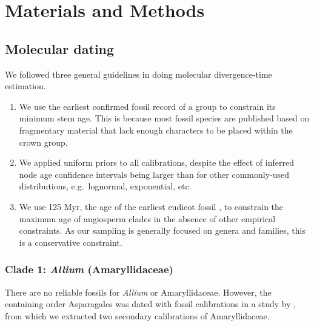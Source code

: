 \documentclass[10pt]{article}
\begin{document}
\raggedright
\parindent 0.5in



\clearpage
\newpage

\section*{Materials and Methods}

\subsection*{Molecular dating}

We followed three general guidelines in doing molecular
divergence-time estimation.

\begin{enumerate}

\item We use the earliest confirmed fossil record of a group to
  constrain its minimum stem age. This is because most fossil species
  are published based on fragmentary material that lack enough
  characters to be placed within the crown group.

\item We applied uniform priors to all calibrations, despite the
  effect of inferred node age confidence intervals being larger than
  for other commonly-used distributions, e.g.\ lognormal, exponential,
  etc.%

\item We use 125 Myr, the age of the earliest eudicot fossil
  \citep{Hughes1994}, to constrain the maximum age of angiosperm
  clades in the absence of other empirical constraints. As our
  sampling is generally focused on genera and families, this is a
  conservative constraint.

\end{enumerate}

\subsubsection*{Clade 1: \textit{Allium} (Amaryllidaceae)}

There are no reliable fossils for \textit{Allium} or
Amaryllidaceae. However, the containing order Asparagales was dated
with fossil calibrations in a study by \citet{Chen2013}, from which we
extracted two secondary calibrations of Amaryllidaceae.
\end{document}

